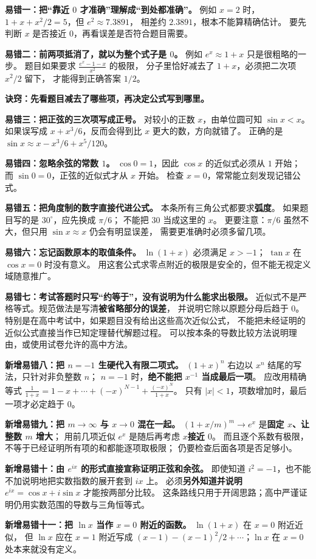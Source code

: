 \clearpage
\begin{trapbox}
\textbf{易错一：把“靠近 $0$ 才准确”理解成“到处都准确”。}
例如 $x=2$ 时，$1+x+x^2/2=5$，但 $e^2\approx7.3891$，
相差约 $2.3891$，根本不能算精确估计。
要先判断 $x$ 是否接近 $0$，再看误差是否符合题目需要。


\textbf{易错二：前两项抵消了，就以为整个式子是 $0$。}
例如 $e^x\approx1+x$ 只是很粗略的一步。
题目如果要求 $\displaystyle\frac{e^x-1-x}{x^2}$ 的极限，
分子里恰好减去了 $1+x$，必须把二次项 $x^2/2$ 留下，
才能得到正确答案 $1/2$。
\begin{minipage}{\linewidth}
\textbf{诀窍：先看题目减去了哪些项，再决定公式写到哪里。}

\end{minipage}


\textbf{易错三：把正弦的三次项写成正号。}
对较小的正数 $x$，由单位圆可知 $\sin x<x$。
如果误写成 $x+x^3/6$，反而会得到比 $x$ 更大的数，方向就错了。
正确的是 $\sin x\approx x-x^3/6+x^5/120$。


\textbf{易错四：忽略余弦的常数 $1$。}
$\cos0=1$，因此 $\cos x$ 的近似式必须从 $1$ 开始；
而 $\sin0=0$，正弦的近似式才从 $x$ 开始。
检查 $x=0$，常常能立刻发现记错公式。

\textbf{易错五：把角度制的数字直接代进公式。}
本条所有三角公式都要求\textbf{弧度}。
如果题目写的是 $30^\circ$，应先换成 $\pi/6$；
不能把 $30$ 当成这里的 $x$。
更要注意：$\pi/6$ 虽然不大，但只用 $\sin x\approx x$ 仍会有明显误差，
需要更准确时必须多留几项。

\textbf{易错六：忘记函数原本的取值条件。}
$\ln(1+x)$ 必须满足 $x>-1$；
$\tan x$ 在 $\cos x=0$ 时没有意义。
用这套公式求零点附近的极限是安全的，但不能无视定义域随意推广。

\textbf{易错七：考试答题时只写“约等于”，没有说明为什么能求出极限。}
近似式不是严格等式。规范做法是写清\textbf{被省略部分的误差}，
并说明它除以原题分母后趋于 $0$。
特别是在高中考试中，如果题目没有给出这些高次近似公式，
不能把未经证明的近似公式直接当作已知定理替代解题过程。
可以按本条的导数比较方法说明理由，或使用试卷允许的高中方法。


\textbf{新增易错八：把 $n=-1$ 生硬代入有限二项式。}
$(1+x)^n$ 右边以 $x^n$ 结尾的写法，只针对非负整数 $n$；
$n=-1$ 时，\textbf{绝不能把 $x^{-1}$ 当成最后一项}。
应改用精确等式
$\frac1{1+x}=1-x+\cdots+(-x)^{N-1}+\frac{(-x)^N}{1+x}$。
只有 $|x|<1$，项数增加时，最后一项才必定趋于 $0$。

\textbf{新增易错九：把 $m\to\infty$ 与 $x\to0$ 混在一起。}
$\left(1+x/m\right)^m\to e^x$ 是\textbf{固定 $x$、让整数 $m$ 增大}；
用前几项近似 $e^x$ 是随后再考虑 $x$\textbf{接近 $0$}。
而且逐个系数有极限，不等于已经证明所有项的和都能逐项取极限；
仍要检查后面各项是否足够小。

\textbf{新增易错十：由 $e^{ix}$ 的形式直接宣称证明正弦和余弦。}
即使知道 $i^2=-1$，也不能不加说明地把实数指数的展开套到 $ix$ 上。
必须\textbf{另外知道并说明} $e^{ix}=\cos x+i\sin x$ 才能按两部分比较。
这条路线只用于开阔思路；高中严谨证明仍用实数范围的导数与三角恒等式。

\textbf{新增易错十一：把 $\ln x$ 当作 $x=0$ 附近的函数。}
$\ln(1+x)$ 在 $x=0$ 附近近似，
但 $\ln x$ 应在 $x=1$ 附近写成
$(x-1)-(x-1)^2/2+\cdots$；$\ln x$ 在 $x=0$ 处本来就没有定义。
\end{trapbox}

